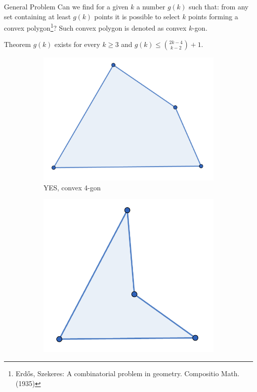 \documentclass{beamer}
\begin{document}
\begin{frame}{General Problem}
Can we find for a given $k$ a number $g(k)$ such that: from any set containing at least $g(k)$ points it is possible to select $k$ points forming a convex polygon\footnote{Erd\H{o}s, Szekeres: A combinatorial problem in geometry. Compositio Math. (1935)}? Such convex polygon is denoted as convex $k$-gon.

\begin{block}{Theorem}
    $g(k)$ exists for every $k \ge 3$ and $g(k) \le \binom{2k-4}{k-2} + 1$.
\end{block}

 {

\begin{figure}
\centering
    \begin{subfigure}[t]{0.3\textwidth}
        \includegraphics[width=\textwidth]{4gon.png}
        \caption{YES, convex 4-gon}
        \label{fig4gon}
    \end{subfigure}
    \begin{subfigure}[t]{0.3\textwidth}
        \includegraphics[width=\textwidth]{not_4gon.png}

\end{subfigure}
\end{figure}}
\end{frame}
\end{document}
